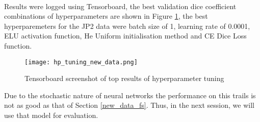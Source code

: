 \paragraph{}
Results were logged using Tensorboard, the best validation dice coefficient combinations of hyperparameters are shown in Figure \ref{tensorboard}, the best hyperparemeters for the JP2 data were batch size of 1, learning rate of 0.0001, ELU activation function, He Uniform initialisation method and CE Dice Loss function.

\begin{figure}[hbt!]
    \centering
    \texttt{[image: hp\_tuning\_new\_data.png]}
    \caption{Tensorboard screenshot of top results of hyperparameter tuning}
    \label{tensorboard}
\end{figure}

Due to the stochastic nature of neural networks the performance on this trails is not as good as that of Section \ref{new_data_fs}. Thus, in the next session, we will use that model for evaluation.
